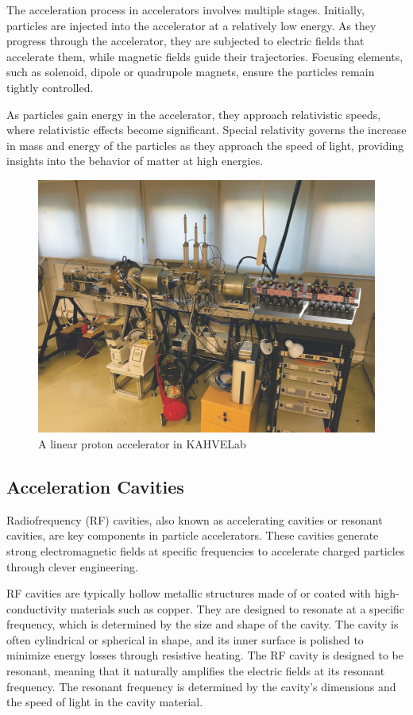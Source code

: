 \documentclass{article}
\begin{document}
The acceleration process in accelerators involves multiple stages. Initially, particles are injected into the accelerator at a relatively low energy. 
As they progress through the accelerator, they are subjected to electric fields that accelerate them, while magnetic fields guide their trajectories.
Focusing elements, such as solenoid, dipole or quadrupole magnets, ensure the particles remain tightly controlled.

As particles gain energy in the accelerator, they approach relativistic speeds, where relativistic effects become significant. 
Special relativity governs the increase in mass and energy of the particles as they approach the speed of light, providing insights into the behavior of matter at high energies.
\begin{figure}[H]
    \centering
    \includegraphics[width=.9\textwidth]{../../../figures/kahvelab_linac.png}
    \caption{A linear proton accelerator in KAHVELab \cite{kahvelab_linac}}
\end{figure}

\subsection{Acceleration Cavities} \label{sec:theory_cavities}
Radiofrequency (RF) cavities, also known as accelerating cavities or resonant cavities, are key components in particle accelerators. 
These cavities generate strong electromagnetic fields at specific frequencies to accelerate charged particles through clever engineering.

RF cavities are typically hollow metallic structures made of or coated with high-conductivity materials such as copper. 
They are designed to resonate at a specific frequency, which is determined by the size and shape of the cavity. 
The cavity is often cylindrical or spherical in shape, and its inner surface is polished to minimize energy losses through resistive heating.
The RF cavity is designed to be resonant, meaning that it naturally amplifies the electric fields at its resonant frequency. 
The resonant frequency is determined by the cavity's dimensions and the speed of light in the cavity material.
\end{document}
